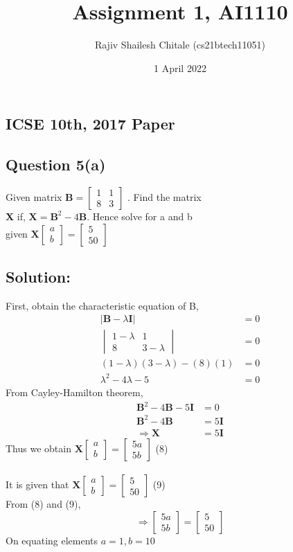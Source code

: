\documentclass[journal,12pt,twocolumn]{IEEEtran}
\title{Assignment 1, AI1110}
\author{Rajiv Shailesh Chitale (cs21btech11051)}
\date{1 April 2022}
\newcommand{\myvec}[1]{\ensuremath{\begin{bmatrix}#1\end{bmatrix}}}
\let\vec\mathbf
\begin{document}
\maketitle

\subsection*{\textbf{ICSE 10th, 2017 Paper}}
\subsection*{\textbf{Question 5(a)}}
    Given matrix $\vec{B} = \begin{bmatrix} 1 & 1 \\8 & 3 \end{bmatrix}$
    . Find the matrix 
    \\
    \textbf{X} if,  $\vec{X} = \vec{B}^2 -4\vec{B}$. Hence solve for a and b
    \\
    given $\vec{X} \myvec{a \\ b}
    = \begin{bmatrix} 5\\50 \end{bmatrix} $
\subsection*{\textbf{Solution:}}
    First, obtain the characteristic equation of B,
    \begin{align}
        |\vec{B}-\lambda \vec{I}| &= 0 
        \\
        \begin{vmatrix} 1-\lambda & 1\\ 8 & 3-\lambda \end{vmatrix} &= 0 
        \\
        (1-\lambda)(3-\lambda)-(8)(1) &= 0
        \\
        \lambda ^2 - 4\lambda -5 &= 0
    \end{align}
        From Cayley-Hamilton theorem,
        \begin{align} 
        \vec{B}^2 -4\vec{B} - 5\vec{I} &= 0
        \\
        \vec{B}^2 -4\vec{B} &= 5\vec{I}
        \\
        \Rightarrow \vec{X} &= 5\vec{I}
    \end{align}
    Thus we obtain $\vec{X} \myvec{a \\ b}
    = \myvec{5a \\ 5b} $
    \hfill (8)
    \\
    \\
    It is given that $\vec{X} \myvec{a \\ b}
    = \myvec{5 \\ 50} $
    \hfill (9)
    \\
    From (8) and (9),
    \[ \Rightarrow \myvec{5a \\ 5b}
    =\myvec{5 \\ 50} \]
    On equating elements $a = 1 , b = 10$
    
\end{document}
